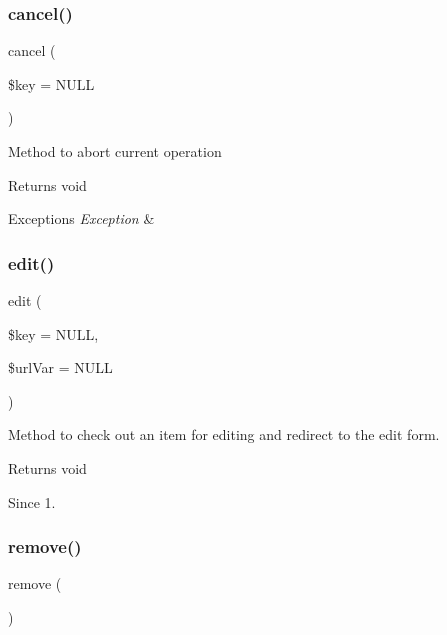 \subsubsection{cancel()}
{\footnotesize\ttfamily cancel (\begin{DoxyParamCaption}\item[{}]{\$key = {\ttfamily NULL} }\end{DoxyParamCaption})}

Method to abort current operation

\begin{DoxyReturn}{Returns}
void
\end{DoxyReturn}

\begin{DoxyExceptions}{Exceptions}
{\em Exception} & \\
\hline
\end{DoxyExceptions}
\mbox{\label{classtks__agenda_controller_download_form_a9e2e09dfbb03820af39dcbac294fce19}} 
\subsubsection{edit()}
{\footnotesize\ttfamily edit (\begin{DoxyParamCaption}\item[{}]{\$key = {\ttfamily NULL},  }\item[{}]{\$url\+Var = {\ttfamily NULL} }\end{DoxyParamCaption})}

Method to check out an item for editing and redirect to the edit form.

\begin{DoxyReturn}{Returns}
void
\end{DoxyReturn}
\begin{DoxySince}{Since}
1. 
\end{DoxySince}
\mbox{\label{classtks__agenda_controller_download_form_aff9a1fb07dca963c2c9a8ffe66b45ded}} 
\subsubsection{remove()}
{\footnotesize\ttfamily remove (\begin{DoxyParamCaption}{ }\end{DoxyParamCaption})}

